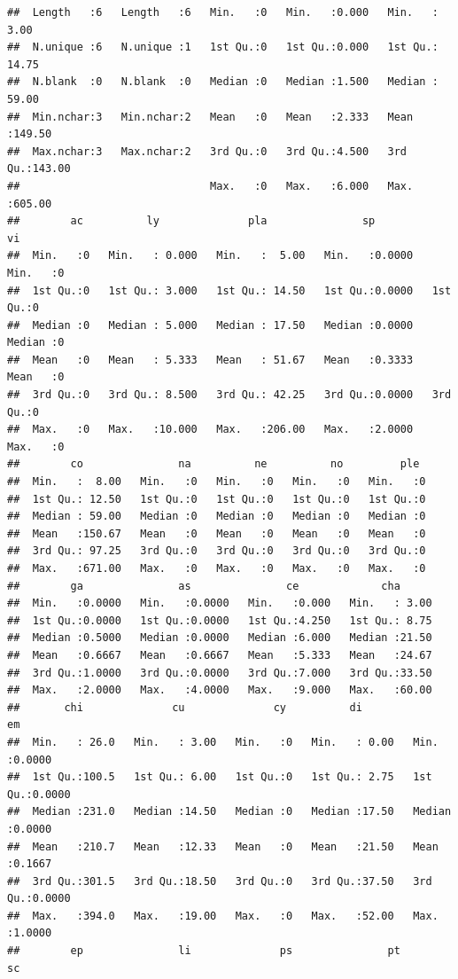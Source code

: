 \documentclass[
]{article}
\begin{document}
\begin{verbatim}
##  Length   :6   Length   :6   Min.   :0   Min.   :0.000   Min.   :  3.00  
##  N.unique :6   N.unique :1   1st Qu.:0   1st Qu.:0.000   1st Qu.: 14.75  
##  N.blank  :0   N.blank  :0   Median :0   Median :1.500   Median : 59.00  
##  Min.nchar:3   Min.nchar:2   Mean   :0   Mean   :2.333   Mean   :149.50  
##  Max.nchar:3   Max.nchar:2   3rd Qu.:0   3rd Qu.:4.500   3rd Qu.:143.00  
##                              Max.   :0   Max.   :6.000   Max.   :605.00  
##        ac          ly              pla               sp               vi   
##  Min.   :0   Min.   : 0.000   Min.   :  5.00   Min.   :0.0000   Min.   :0  
##  1st Qu.:0   1st Qu.: 3.000   1st Qu.: 14.50   1st Qu.:0.0000   1st Qu.:0  
##  Median :0   Median : 5.000   Median : 17.50   Median :0.0000   Median :0  
##  Mean   :0   Mean   : 5.333   Mean   : 51.67   Mean   :0.3333   Mean   :0  
##  3rd Qu.:0   3rd Qu.: 8.500   3rd Qu.: 42.25   3rd Qu.:0.0000   3rd Qu.:0  
##  Max.   :0   Max.   :10.000   Max.   :206.00   Max.   :2.0000   Max.   :0  
##        co               na          ne          no         ple   
##  Min.   :  8.00   Min.   :0   Min.   :0   Min.   :0   Min.   :0  
##  1st Qu.: 12.50   1st Qu.:0   1st Qu.:0   1st Qu.:0   1st Qu.:0  
##  Median : 59.00   Median :0   Median :0   Median :0   Median :0  
##  Mean   :150.67   Mean   :0   Mean   :0   Mean   :0   Mean   :0  
##  3rd Qu.: 97.25   3rd Qu.:0   3rd Qu.:0   3rd Qu.:0   3rd Qu.:0  
##  Max.   :671.00   Max.   :0   Max.   :0   Max.   :0   Max.   :0  
##        ga               as               ce             cha       
##  Min.   :0.0000   Min.   :0.0000   Min.   :0.000   Min.   : 3.00  
##  1st Qu.:0.0000   1st Qu.:0.0000   1st Qu.:4.250   1st Qu.: 8.75  
##  Median :0.5000   Median :0.0000   Median :6.000   Median :21.50  
##  Mean   :0.6667   Mean   :0.6667   Mean   :5.333   Mean   :24.67  
##  3rd Qu.:1.0000   3rd Qu.:0.0000   3rd Qu.:7.000   3rd Qu.:33.50  
##  Max.   :2.0000   Max.   :4.0000   Max.   :9.000   Max.   :60.00  
##       chi              cu              cy          di              em        
##  Min.   : 26.0   Min.   : 3.00   Min.   :0   Min.   : 0.00   Min.   :0.0000  
##  1st Qu.:100.5   1st Qu.: 6.00   1st Qu.:0   1st Qu.: 2.75   1st Qu.:0.0000  
##  Median :231.0   Median :14.50   Median :0   Median :17.50   Median :0.0000  
##  Mean   :210.7   Mean   :12.33   Mean   :0   Mean   :21.50   Mean   :0.1667  
##  3rd Qu.:301.5   3rd Qu.:18.50   3rd Qu.:0   3rd Qu.:37.50   3rd Qu.:0.0000  
##  Max.   :394.0   Max.   :19.00   Max.   :0   Max.   :52.00   Max.   :1.0000  
##        ep               li              ps               pt               sc   

\end{verbatim}
\end{document}
